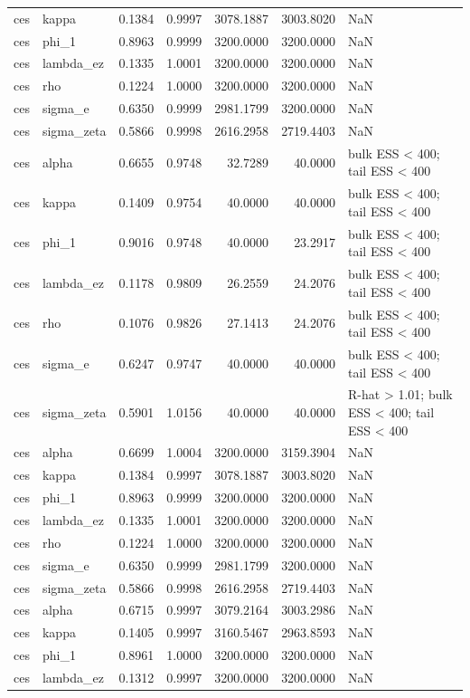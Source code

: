 \begin{tabular}{llrrrrl}
ces & kappa & 0.1384 & 0.9997 & 3078.1887 & 3003.8020 & NaN \\
ces & phi\_1 & 0.8963 & 0.9999 & 3200.0000 & 3200.0000 & NaN \\
ces & lambda\_ez & 0.1335 & 1.0001 & 3200.0000 & 3200.0000 & NaN \\
ces & rho & 0.1224 & 1.0000 & 3200.0000 & 3200.0000 & NaN \\
ces & sigma\_e & 0.6350 & 0.9999 & 2981.1799 & 3200.0000 & NaN \\
ces & sigma\_zeta & 0.5866 & 0.9998 & 2616.2958 & 2719.4403 & NaN \\
ces & alpha & 0.6655 & 0.9748 & 32.7289 & 40.0000 & bulk ESS < 400; tail ESS < 400 \\
ces & kappa & 0.1409 & 0.9754 & 40.0000 & 40.0000 & bulk ESS < 400; tail ESS < 400 \\
ces & phi\_1 & 0.9016 & 0.9748 & 40.0000 & 23.2917 & bulk ESS < 400; tail ESS < 400 \\
ces & lambda\_ez & 0.1178 & 0.9809 & 26.2559 & 24.2076 & bulk ESS < 400; tail ESS < 400 \\
ces & rho & 0.1076 & 0.9826 & 27.1413 & 24.2076 & bulk ESS < 400; tail ESS < 400 \\
ces & sigma\_e & 0.6247 & 0.9747 & 40.0000 & 40.0000 & bulk ESS < 400; tail ESS < 400 \\
ces & sigma\_zeta & 0.5901 & 1.0156 & 40.0000 & 40.0000 & R-hat > 1.01; bulk ESS < 400; tail ESS < 400 \\
ces & alpha & 0.6699 & 1.0004 & 3200.0000 & 3159.3904 & NaN \\
ces & kappa & 0.1384 & 0.9997 & 3078.1887 & 3003.8020 & NaN \\
ces & phi\_1 & 0.8963 & 0.9999 & 3200.0000 & 3200.0000 & NaN \\
ces & lambda\_ez & 0.1335 & 1.0001 & 3200.0000 & 3200.0000 & NaN \\
ces & rho & 0.1224 & 1.0000 & 3200.0000 & 3200.0000 & NaN \\
ces & sigma\_e & 0.6350 & 0.9999 & 2981.1799 & 3200.0000 & NaN \\
ces & sigma\_zeta & 0.5866 & 0.9998 & 2616.2958 & 2719.4403 & NaN \\
ces & alpha & 0.6715 & 0.9997 & 3079.2164 & 3003.2986 & NaN \\
ces & kappa & 0.1405 & 0.9997 & 3160.5467 & 2963.8593 & NaN \\
ces & phi\_1 & 0.8961 & 1.0000 & 3200.0000 & 3200.0000 & NaN \\
ces & lambda\_ez & 0.1312 & 0.9997 & 3200.0000 & 3200.0000 & NaN \\

\end{tabular}
